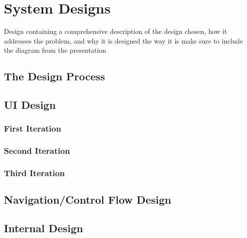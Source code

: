 \section{System Designs}
{\color{red} Design containing a comprehensive description of the design chosen, how it addresses the problem, and why it is designed the way it is}
{\color{red}  make sure to include the diagram from the presentation}

\subsection{The Design Process}
{\color{red}  }



\subsection{UI Design}
{\color{red}  }


	\subsubsection{First Iteration}
	{\color{red}  }



	\subsubsection{Second Iteration}
	{\color{red}  }


	\subsubsection{Third Iteration}		
	{\color{red}  }


\subsection{Navigation/Control Flow Design}		
{\color{red}  }


\subsection{Internal Design}
{\color{red}  }
